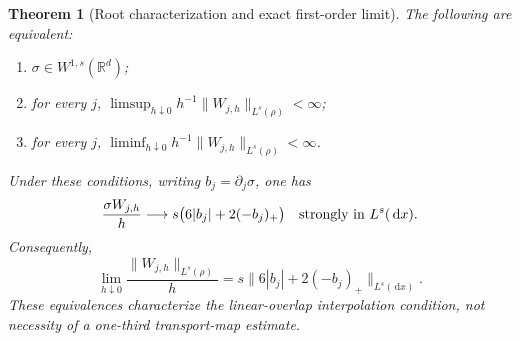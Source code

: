 \documentclass[11pt]{article}
\newtheorem{theorem}{Theorem}[section]
\theoremstyle{remark}\newtheorem{remark}[theorem]{Remark}
\newcommand{\R}{\mathbb R}
\newcommand{\dd}{\,\mathrm d}
\newcommand{\norm}[1]{\lVert#1\rVert}
\begin{document}
\begin{theorem}[Root characterization and exact first-order limit]\label{thm:root}
The following are equivalent:
\begin{enumerate}
\item $\sigma\in W^{1,s}(\R^d)$;
\item for every $j$, $\limsup_{h\downarrow0}h^{-1}\norm{W_{j,h}}_{L^s(\rho)}<\infty$;
\item for every $j$, $\liminf_{h\downarrow0}h^{-1}\norm{W_{j,h}}_{L^s(\rho)}<\infty$.
\end{enumerate}
Under these conditions, writing $b_j=\partial_j\sigma$, one has
\begin{equation}\label{eq:strong-limit}
 \frac{\sigma W_{j,h}}h\longrightarrow
 s\bigl(6|b_j|+2(-b_j)_+\bigr)
 \quad\hbox{strongly in }L^s(\dd x).
\end{equation}
Consequently,
\begin{equation}\label{eq:norm-limit}
 \lim_{h\downarrow0}\frac{\norm{W_{j,h}}_{L^s(\rho)}}h
 =s\norm{6|b_j|+2(-b_j)_+}_{L^s(\dd x)}.
\end{equation}
These equivalences characterize the linear-overlap interpolation condition, not necessity of a one-third transport-map estimate.
\end{theorem}
\end{document}
